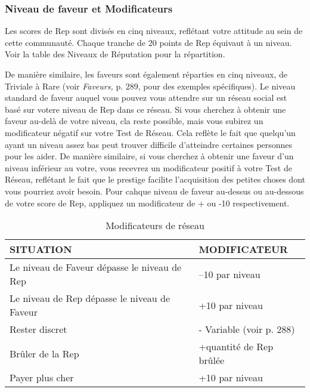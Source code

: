 \subsubsection{Niveau de faveur et Modificateurs} 

Les scores de Rep sont divisés en cinq niveaux, reflétant votre attitude au sein de cette communauté. Chaque tranche de 20 points de Rep équivaut à un niveau. Voir la table des Niveaux de Réputation pour la répartition. 

De manière similaire, les faveurs sont également réparties en cinq niveaux, de Triviale à Rare (voir \textit{Faveurs, } p. 289, pour des exemples spécifiques). Le niveau standard de faveur auquel vous pouvez vous attendre sur un réseau social est basé sur votere niveau de Rep dans ce réseau. Si vous cherchez à obtenir une faveur au-delà de votre niveau, cla reste possible, mais vous subirez un modificateur négatif sur votre Test de Réseau. Cela reflète le fait que quelqu'un ayant un niveau assez bas peut trouver difficile d'atteindre certaines personnes pour les aider. De manière similaire, si vous cherchez à obtenir une faveur d'un niveau inférieur au votre, vous recevrez un modificateur positif à votre Test de Réseau, reflétant le fait que le prestige facilite l'acquisition des petites choses dont vous pourriez avoir besoin. Pour cahque niveau de faveur au-dessus ou au-dessous de votre score de Rep, appliquez un modificateur de + ou -10 respectivement. 

\begin{table} \caption{Modificateurs de réseau} \begin{tabular}{|l|l|} \hline

SITUATION &MODIFICATEUR\\ \hline

Le niveau de Faveur dépasse le niveau de Rep &–10 par niveau \\ \hline

Le niveau de Rep dépasse le niveau de Faveur &+10 par niveau \\ \hline

Rester discret &- Variable (voir p. 288) \\ \hline

Brûler de la Rep &+quantité de Rep brûlée\\ \hline

Payer plus cher &+10 par niveau \\ \hline

\end{tabular} \end{table} 

